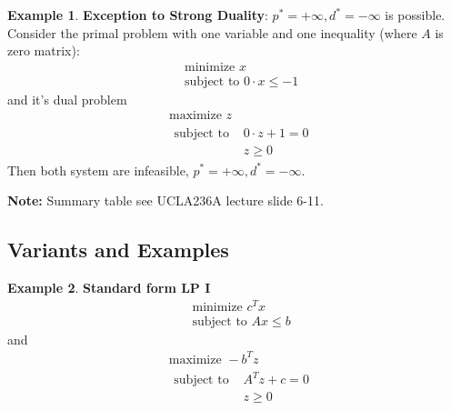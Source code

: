 \documentclass[10pt]{article}
\theoremstyle{definition}
\newtheorem{example}{Example}[section]
\newcommand{\Note}[0]{\noindent\textbf{Note: }}
\begin{document}
\begin{example}
	\textbf{Exception to Strong Duality}: $p^* = +\infty, d^* = -\infty$ is possible.
	Consider the primal problem with one variable and one inequality (where $A$ is zero matrix):
	\begin{equation*}
		\begin{split}
			&\text{minimize } x\\
			&\text{subject to } 0 \cdot x \le -1
		\end{split}
	\end{equation*}
	and it's dual problem
	\begin{equation*}
		\begin{split}
			&\text{maximize } z\\
			&\begin{split}
				\text{subject to } & 0 \cdot z + 1 = 0\\
				&z \ge 0
			\end{split}
		\end{split}
	\end{equation*}
	Then both system are infeasible, $p^* = +\infty, d^* = -\infty$.
\end{example}

\Note Summary table see UCLA236A lecture slide 6-11.

\subsection{Variants and Examples}
\begin{example} \textbf{Standard form LP I}
	\begin{equation*}
		\begin{split}
			&\text{minimize } c^Tx\\
			&\text{subject to } Ax \le b
		\end{split}
	\end{equation*}
	and 
	\begin{equation*}
		\begin{split}
			&\text{maximize } -b^Tz\\
			&\begin{split}
				\text{subject to } &A^Tz + c = 0\\
				&z \ge 0
			\end{split}
		\end{split}
	\end{equation*}
\end{example}
\end{document}
